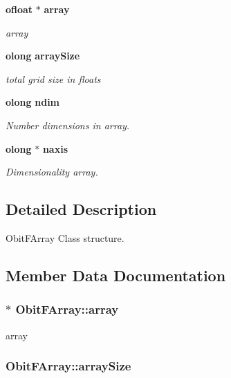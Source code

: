 \begin{CompactItemize}
{\bf ofloat} $\ast$ {\bf array}
\begin{CompactList}\small\item\em array \item\end{CompactList}\item 
{\bf olong} {\bf array\-Size}
\begin{CompactList}\small\item\em total grid size in floats \item\end{CompactList}\item 
{\bf olong} {\bf ndim}
\begin{CompactList}\small\item\em Number dimensions in array. \item\end{CompactList}\item 
{\bf olong} $\ast$ {\bf naxis}
\begin{CompactList}\small\item\em Dimensionality array. \item\end{CompactList}\end{CompactItemize}


\subsection{Detailed Description}
Obit\-FArray Class structure. 



\subsection{Member Data Documentation}
\subsubsection{$\ast$ {\bf Obit\-FArray::array}}\label{structObitFArray_o6}


array 

\subsubsection{ {\bf Obit\-FArray::array\-Size}}\label{structObitFArray_o7}



